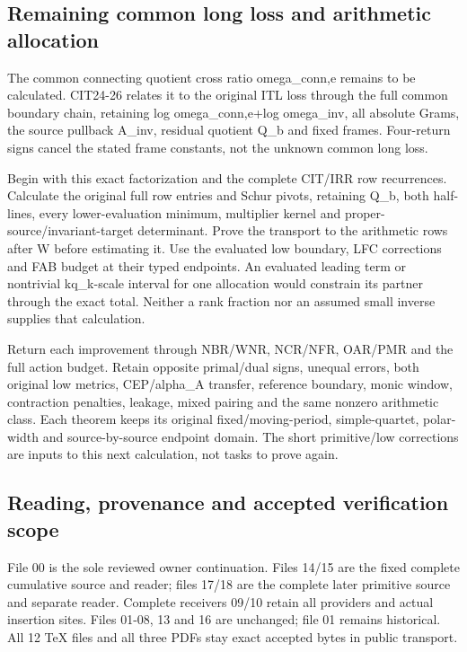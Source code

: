 \documentclass[
]{article}
\begin{document}
\subsection{Remaining common long loss and arithmetic
allocation}\label{remaining-common-long-loss-and-arithmetic-allocation}

The common connecting quotient cross ratio omega\_conn,e remains to be
calculated. CIT24-26 relates it to the original ITL loss through the
full common boundary chain, retaining log omega\_conn,e+log omega\_inv,
all absolute Grams, the source pullback A\_inv, residual quotient Q\_b
and fixed frames. Four-return signs cancel the stated frame constants,
not the unknown common long loss.

Begin with this exact factorization and the complete CIT/IRR row
recurrences. Calculate the original full row entries and Schur pivots,
retaining Q\_b, both half-lines, every lower-evaluation minimum,
multiplier kernel and proper-source/invariant-target determinant. Prove
the transport to the arithmetic rows after W before estimating it. Use
the evaluated low boundary, LFC corrections and FAB budget at their
typed endpoints. An evaluated leading term or nontrivial kq\_k-scale
interval for one allocation would constrain its partner through the
exact total. Neither a rank fraction nor an assumed small inverse
supplies that calculation.

Return each improvement through NBR/WNR, NCR/NFR, OAR/PMR and the full
action budget. Retain opposite primal/dual signs, unequal errors, both
original low metrics, CEP/alpha\_A transfer, reference boundary, monic
window, contraction penalties, leakage, mixed pairing and the same
nonzero arithmetic class. Each theorem keeps its original
fixed/moving-period, simple-quartet, polar-width and source-by-source
endpoint domain. The short primitive/low corrections are inputs to this
next calculation, not tasks to prove again.

\subsection{Reading, provenance and accepted verification
scope}\label{reading-provenance-and-accepted-verification-scope}

File 00 is the sole reviewed owner continuation. Files 14/15 are the
fixed complete cumulative source and reader; files 17/18 are the
complete later primitive source and separate reader. Complete receivers
09/10 retain all providers and actual insertion sites. Files 01-08, 13
and 16 are unchanged; file 01 remains historical. All 12 TeX files and
all three PDFs stay exact accepted bytes in public transport.
\end{document}
